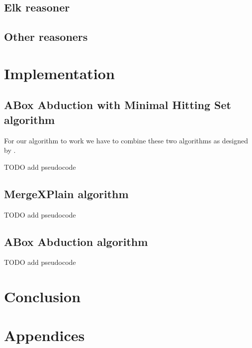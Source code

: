 \documentclass[12pt,a4paper]{article}
\begin{document}
\subsection{Elk reasoner}

\subsection{Other reasoners}

\section{Implementation}

\subsection{ABox Abduction with Minimal Hitting Set algorithm}
For our algorithm to work we have to combine these two algorithms as designed by \citep{pukancovaAboxAbduction}. 

TODO add pseudocode

\subsection{MergeXPlain algorithm}

TODO add pseudocode

\subsection{ABox Abduction algorithm}

TODO add pseudocode

\pagebreak
\section*{Conclusion}

\pagebreak
{}



\pagebreak
\section*{Appendices}
\end{document}
